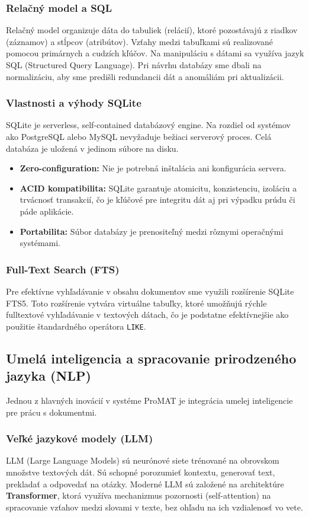 \documentclass[12pt, a4paper]{article}
\begin{document}
\begin{titlepage}
\subsubsection{Relačný model a SQL}
Relačný model organizuje dáta do tabuliek (relácií), ktoré pozostávajú z riadkov (záznamov) a stĺpcov (atribútov). Vzťahy medzi tabuľkami sú realizované pomocou primárnych a cudzích kľúčov. Na manipuláciu s dátami sa využíva jazyk SQL (Structured Query Language). Pri návrhu databázy sme dbali na normalizáciu, aby sme predišli redundancii dát a anomáliám pri aktualizácii.

\subsubsection{Vlastnosti a výhody SQLite}
SQLite je serverless, self-contained databázový engine. Na rozdiel od systémov ako PostgreSQL alebo MySQL nevyžaduje bežiaci serverový proces. Celá databáza je uložená v jedinom súbore na disku.
\begin{itemize}
    \item \textbf{Zero-configuration:} Nie je potrebná inštalácia ani konfigurácia servera.
    \item \textbf{ACID kompatibilita:} SQLite garantuje atomicitu, konzistenciu, izoláciu a trvácnosť transakcií, čo je kľúčové pre integritu dát aj pri výpadku prúdu či páde aplikácie.
    \item \textbf{Portabilita:} Súbor databázy je prenositeľný medzi rôznymi operačnými systémami.
\end{itemize}

\subsubsection{Full-Text Search (FTS)}
Pre efektívne vyhľadávanie v obsahu dokumentov sme využili rozšírenie SQLite FTS5. Toto rozšírenie vytvára virtuálne tabuľky, ktoré umožňujú rýchle fulltextové vyhľadávanie v textových dátach, čo je podstatne efektívnejšie ako použitie štandardného operátora \texttt{LIKE}.

\subsection{Umelá inteligencia a spracovanie prirodzeného jazyka (NLP)}
Jednou z hlavných inovácií v systéme ProMAT je integrácia umelej inteligencie pre prácu s dokumentmi.

\subsubsection{Veľké jazykové modely (LLM)}
LLM (Large Language Models) sú neurónové siete trénované na obrovskom množstve textových dát. Sú schopné porozumieť kontextu, generovať text, prekladať a odpovedať na otázky. Moderné LLM sú založené na architektúre \textbf{Transformer}, ktorá využíva mechanizmus pozornosti (self-attention) na spracovanie vzťahov medzi slovami v texte, bez ohľadu na ich vzdialenosť vo vete.


\end{titlepage}
\end{document}
